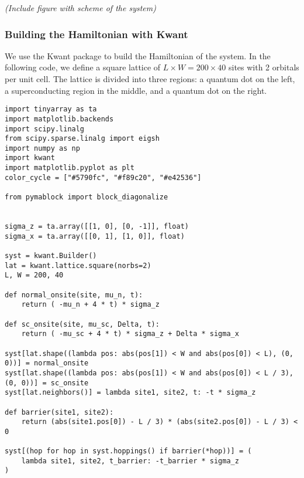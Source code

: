 \textit{(Include figure with scheme of the system)}

\subsubsection{Building the Hamiltonian with Kwant}

We use the Kwant package \cite{Groth_2014} to build
the Hamiltonian of the system.
In the following code, we define a square lattice of $L \times W = 200 \times
40$ sites with 2 orbitals per unit cell.
The lattice is divided into three regions: a quantum dot on the left, a
superconducting region in the middle, and a quantum dot on the right.
%
\begin{verbatim}
import tinyarray as ta
import matplotlib.backends
import scipy.linalg
from scipy.sparse.linalg import eigsh
import numpy as np
import kwant
import matplotlib.pyplot as plt
color_cycle = ["#5790fc", "#f89c20", "#e42536"]

from pymablock import block_diagonalize


sigma_z = ta.array([[1, 0], [0, -1]], float)
sigma_x = ta.array([[0, 1], [1, 0]], float)

syst = kwant.Builder()
lat = kwant.lattice.square(norbs=2)
L, W = 200, 40

def normal_onsite(site, mu_n, t):
    return ( -mu_n + 4 * t) * sigma_z

def sc_onsite(site, mu_sc, Delta, t):
    return ( -mu_sc + 4 * t) * sigma_z + Delta * sigma_x

syst[lat.shape((lambda pos: abs(pos[1]) < W and abs(pos[0]) < L), (0, 0))] = normal_onsite
syst[lat.shape((lambda pos: abs(pos[1]) < W and abs(pos[0]) < L / 3), (0, 0))] = sc_onsite
syst[lat.neighbors()] = lambda site1, site2, t: -t * sigma_z

def barrier(site1, site2):
    return (abs(site1.pos[0]) - L / 3) * (abs(site2.pos[0]) - L / 3) < 0

syst[(hop for hop in syst.hoppings() if barrier(*hop))] = (
    lambda site1, site2, t_barrier: -t_barrier * sigma_z
)
\end{verbatim}

